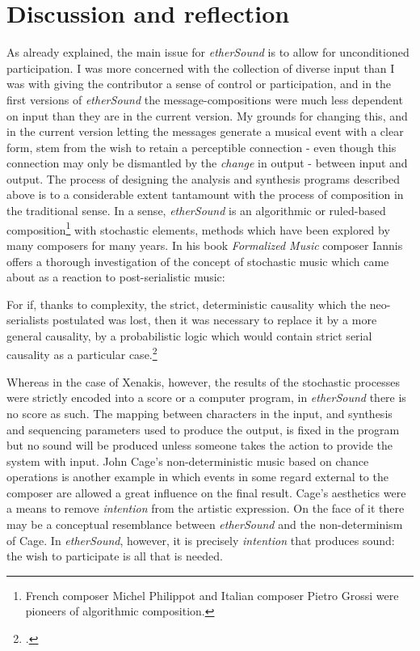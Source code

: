 \section{Discussion and reflection} 
As already explained, the main issue for \emph{etherSound} is to allow for unconditioned participation. I was more concerned with the collection of diverse input than I was with giving the contributor a sense of control or participation, and in the first versions of \emph{etherSound} the message-compositions were much less dependent on input than they are in the current version. My grounds for changing this, and in the current version letting the messages generate a musical event with a clear form, stem from the wish to retain a perceptible connection - even though this connection may only be dismantled by the \emph{change} in output - between input and output. 
The process of designing the analysis and synthesis programs described above is to a considerable extent tantamount with the process of composition in the traditional sense. In a sense, \emph{etherSound} is an algorithmic or ruled-based composition\footnote{French composer Michel Philippot and Italian composer Pietro Grossi were pioneers of algorithmic composition.} with stochastic elements, methods which have been explored by many composers for many years. In his book \textit{Formalized Music} composer Iannis \citeauthor{xenakis71} offers a thorough investigation of the concept of stochastic music which came about as a reaction to post-serialistic music:

\begin{squote}
 For if, thanks to complexity, the strict, deterministic causality which the neo-serialists postulated was lost, then it was necessary to replace it by a more general causality, by a probabilistic logic which would contain strict serial causality as a particular case.\footcite[8]{xenakis71}
\end{squote}

Whereas in the case of Xenakis, however, the results of the stochastic processes were strictly encoded into a score or a computer program, in \emph{etherSound} there is no score as such. The mapping between characters in the input, and synthesis and sequencing parameters used to produce the output, is fixed in the program but no sound will be produced unless someone takes the action to provide the system with input. John Cage's non-deterministic music based on chance operations is another example in which events in some regard external to the composer are allowed a great influence on the final result. Cage's aesthetics were a means to remove \textit{intention} from the artistic expression. On the face of it there may be a conceptual resemblance between \emph{etherSound} and the non-determinism of Cage. In \emph{etherSound}, however, it is precisely \textit{intention} that produces sound: the wish to participate is all that is needed. 


